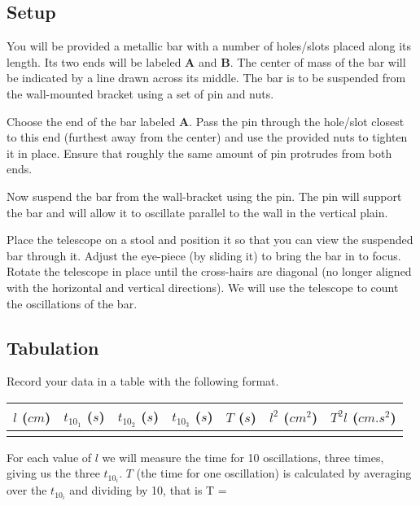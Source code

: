 \documentclass{article}
\begin{document}
      \subsection*{Setup}

         You will be provided a metallic bar with a number of holes/slots placed along its length. Its two ends will be labeled \textbf{A} and \textbf{B}. The center of mass of the bar will be indicated by a line drawn across its middle. The bar is to be suspended from the wall-mounted bracket using a set of pin and nuts.

         Choose the end of the bar labeled \textbf{A}. Pass the pin through the hole/slot closest to this end (furthest away from the center) and use the provided nuts to tighten it in place. Ensure that roughly the same amount of pin protrudes from both ends.

         Now suspend the bar from the wall-bracket using the pin. The pin will support the bar and will allow it to oscillate parallel to the wall in the vertical plain.

         Place the telescope on a stool and position it so that you can view the suspended bar through it. Adjust the eye-piece (by sliding it) to bring the bar in to focus. Rotate the telescope in place until the cross-hairs are diagonal (no longer aligned with the horizontal and vertical directions). We will use the telescope to count the oscillations of the bar.

      \subsection*{Tabulation}

         Record your data in a table with the following format.

         \begin{table}[h]
            \centering

            \begin{tabular}{| c | c | c | c || c || c | c |}

               \hline
               $l$ ($cm$) & $t_{10_1}$ ($s$) & $t_{10_2}$ ($s$) & $t_{10_3}$ ($s$) & $T$ ($s$) & $l^2$ (${cm}^2$) & $T^2 l$ (${cm}.s^2$) \\

               \hline
                  & & & & & & \\
               \hline

            \end{tabular}
         \end{table}
         For each value of $l$ we will measure the time for 10 oscillations, three times, giving us the three $t_{10_i}$. $T$ (the time for one oscillation) is calculated by averaging over the $t_{10_i}$ and dividing by 10, that is
         \beq \label{calc_T}
            T = 
         \eeq
\end{document}
